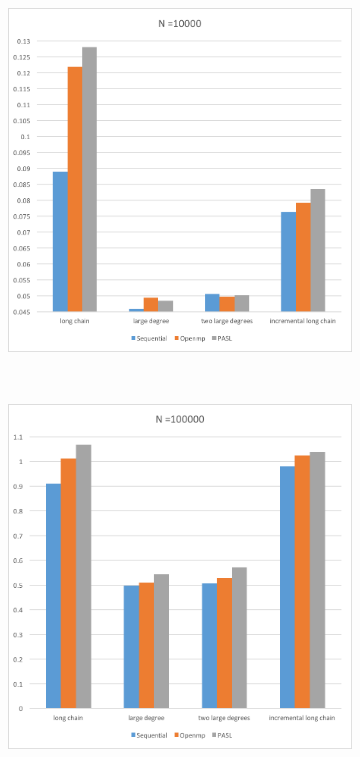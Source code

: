 \documentclass[specification,annotation]{itmo-student-thesis}
\begin{document}
\begin{figure}[!ht]
\centering
\begin{subfigure}[b]{0.45\textwidth}
    \includegraphics[width=\textwidth]{pic/results-1-a.png}
\end{subfigure}~~\begin{subfigure}[b]{0.45\textwidth}
    \includegraphics[width=\textwidth]{pic/results-1-b.png}

\end{subfigure}
\end{figure}
\end{document}
